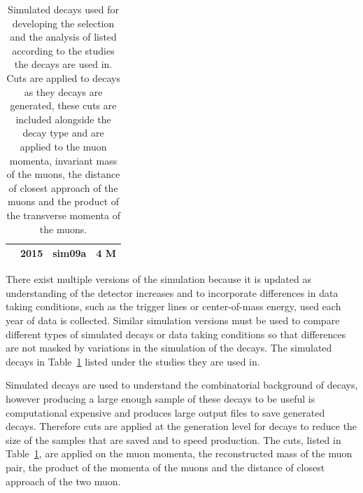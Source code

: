 \begin{table}[htbp]
\begin{center}
\begin{tabular}{p{}p{}p{}p{}}
{{        		& 2015	& sim09a   		& 4 M \\  \hline
\end{tabular}
\vspace{0.7cm}
\caption{Simulated decays used for developing the selection and the analysis of \bsmumu listed according to the studies the decays are used in. Cuts are applied to \bbbarmumux decays as they decays are generated, these cuts are included alongside the decay type and are applied to the muon momenta, invariant mass of the muons, the distance of closest approach of the muons and the product of the transverse momenta of the muons.}
\label{tab:MC_decays}
\end{center}
\end{table}

There exist multiple versions of the simulation because it is updated as understanding of the detector increases and to incorporate differences in data taking conditions, such as the trigger lines or center-of-mass energy, used each year of data is collected. Similar simulation versions must be used to compare different types of simulated decays or data taking conditions so that differences are not masked by variations in the simulation of the decays. The simulated decays in Table~\ref{tab:MC_decays} listed under the studies they are used in. 

Simulated \bbbarmumux decays are used to understand the combinatorial background of \bsmumu decays, however producing a large enough sample of these decays to be useful is computational expensive and produces large output files to save generated decays. Therefore cuts are applied at the generation level for \bbbarmumux decays to reduce the size of the samples that are saved and to speed production. The cuts, listed in Table~\ref{tab:MC_decays}, are applied on the muon momenta, the reconstructed mass of the muon pair, the product of the momenta of the muons and the distance of closest approach of the two muon. %
  

